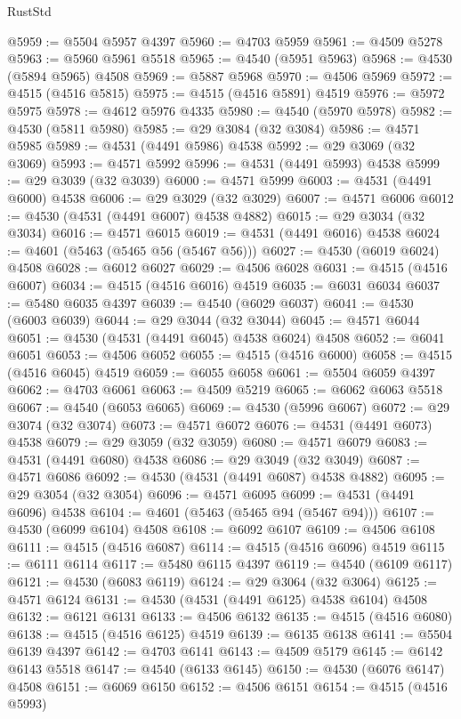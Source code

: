 \begin{lexlean}{RustStd}
\begin{coremodule}
{\begin{coremodule}
{{{{{{{{{{{{{{{{{{{{{{{{{{{{{{{{{{{{{{{{{{{{{{{{{{{{{{{@5959 := @5504 @5957 @4397
@5960 := @4703 @5959
@5961 := @4509 @5278
@5963 := @5960 @5961 @5518
@5965 := @4540 (@5951 @5963)
@5968 := @4530 (@5894 @5965) @4508
@5969 := @5887 @5968
@5970 := @4506 @5969
@5972 := @4515 (@4516 @5815)
@5975 := @4515 (@4516 @5891) @4519
@5976 := @5972 @5975
@5978 := @4612 @5976 @4335
@5980 := @4540 (@5970 @5978)
@5982 := @4530 (@5811 @5980)
@5985 := @29 @3084 (@32 @3084)
@5986 := @4571 @5985
@5989 := @4531 (@4491 @5986) @4538
@5992 := @29 @3069 (@32 @3069)
@5993 := @4571 @5992
@5996 := @4531 (@4491 @5993) @4538
@5999 := @29 @3039 (@32 @3039)
@6000 := @4571 @5999
@6003 := @4531 (@4491 @6000) @4538
@6006 := @29 @3029 (@32 @3029)
@6007 := @4571 @6006
@6012 := @4530 (@4531 (@4491 @6007) @4538 @4882)
@6015 := @29 @3034 (@32 @3034)
@6016 := @4571 @6015
@6019 := @4531 (@4491 @6016) @4538
@6024 := @4601 (@5463 (@5465 @56 (@5467 @56)))
@6027 := @4530 (@6019 @6024) @4508
@6028 := @6012 @6027
@6029 := @4506 @6028
@6031 := @4515 (@4516 @6007)
@6034 := @4515 (@4516 @6016) @4519
@6035 := @6031 @6034
@6037 := @5480 @6035 @4397
@6039 := @4540 (@6029 @6037)
@6041 := @4530 (@6003 @6039)
@6044 := @29 @3044 (@32 @3044)
@6045 := @4571 @6044
@6051 := @4530 (@4531 (@4491 @6045) @4538 @6024) @4508
@6052 := @6041 @6051
@6053 := @4506 @6052
@6055 := @4515 (@4516 @6000)
@6058 := @4515 (@4516 @6045) @4519
@6059 := @6055 @6058
@6061 := @5504 @6059 @4397
@6062 := @4703 @6061
@6063 := @4509 @5219
@6065 := @6062 @6063 @5518
@6067 := @4540 (@6053 @6065)
@6069 := @4530 (@5996 @6067)
@6072 := @29 @3074 (@32 @3074)
@6073 := @4571 @6072
@6076 := @4531 (@4491 @6073) @4538
@6079 := @29 @3059 (@32 @3059)
@6080 := @4571 @6079
@6083 := @4531 (@4491 @6080) @4538
@6086 := @29 @3049 (@32 @3049)
@6087 := @4571 @6086
@6092 := @4530 (@4531 (@4491 @6087) @4538 @4882)
@6095 := @29 @3054 (@32 @3054)
@6096 := @4571 @6095
@6099 := @4531 (@4491 @6096) @4538
@6104 := @4601 (@5463 (@5465 @94 (@5467 @94)))
@6107 := @4530 (@6099 @6104) @4508
@6108 := @6092 @6107
@6109 := @4506 @6108
@6111 := @4515 (@4516 @6087)
@6114 := @4515 (@4516 @6096) @4519
@6115 := @6111 @6114
@6117 := @5480 @6115 @4397
@6119 := @4540 (@6109 @6117)
@6121 := @4530 (@6083 @6119)
@6124 := @29 @3064 (@32 @3064)
@6125 := @4571 @6124
@6131 := @4530 (@4531 (@4491 @6125) @4538 @6104) @4508
@6132 := @6121 @6131
@6133 := @4506 @6132
@6135 := @4515 (@4516 @6080)
@6138 := @4515 (@4516 @6125) @4519
@6139 := @6135 @6138
@6141 := @5504 @6139 @4397
@6142 := @4703 @6141
@6143 := @4509 @5179
@6145 := @6142 @6143 @5518
@6147 := @4540 (@6133 @6145)
@6150 := @4530 (@6076 @6147) @4508
@6151 := @6069 @6150
@6152 := @4506 @6151
@6154 := @4515 (@4516 @5993)
}}}}}}}}}}}}}}}}}}}}}}}}}}}}}}}}}}}}}}}}}}}}}}}}}}}}}}}
\end{coremodule}}
\end{coremodule}
\end{lexlean}

